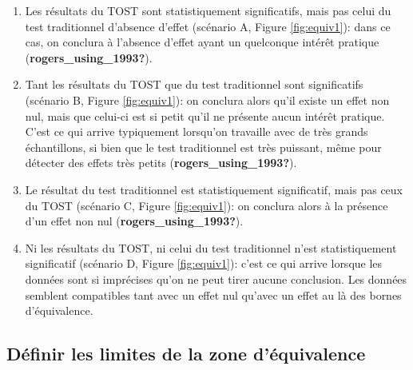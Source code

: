 \documentclass[
  english,
  man]{apa6}
\begin{document}
\newpage

\begin{enumerate}
\def\labelenumi{(\arabic{enumi})}
\item
  Les résultats du TOST sont statistiquement significatifs, mais pas celui du test traditionnel d'absence d'effet (scénario A, Figure \ref{fig:equiv1}): dans ce cas, on conclura à l'absence d'effet ayant un quelconque intérêt pratique (\textbf{rogers\_using\_1993?}).
\item
  Tant les résultats du TOST que du test traditionnel sont significatifs (scénario B, Figure \ref{fig:equiv1}): on conclura alors qu'il existe un effet non nul, mais que celui-ci est si petit qu'il ne présente aucun intérêt pratique. C'est ce qui arrive typiquement lorsqu'on travaille avec de très grands échantillons, si bien que le test traditionnel est très puissant, même pour détecter des effets très petits (\textbf{rogers\_using\_1993?}).
\item
  Le résultat du test traditionnel est statistiquement significatif, mais pas ceux du TOST (scénario C, Figure \ref{fig:equiv1}): on conclura alors à la présence d'un effet non nul (\textbf{rogers\_using\_1993?}).
\item
  Ni les résultats du TOST, ni celui du test traditionnel n'est statistiquement significatif (scénario D, Figure \ref{fig:equiv1}): c'est ce qui arrive lorsque les données sont si imprécises qu'on ne peut tirer aucune conclusion. Les données semblent compatibles tant avec un effet nul qu'avec un effet au là des bornes d'équivalence.
\end{enumerate}

\hypertarget{duxe9finir-les-limites-de-la-zone-duxe9quivalence}{%
\subsection{Définir les limites de la zone d'équivalence}\label{duxe9finir-les-limites-de-la-zone-duxe9quivalence}}
\end{document}
